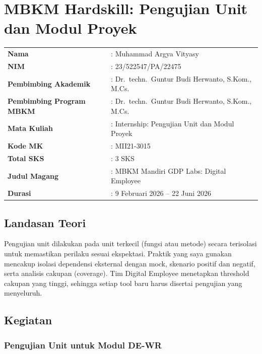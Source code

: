 \section{MBKM Hardskill: Pengujian Unit dan Modul Proyek}

\begin{table}[H]
    \centering
    \begin{tabular}{ll}
        \textbf{Nama} & : Muhammad Argya Vityasy \\
        \textbf{NIM} & : 23/522547/PA/22475 \\
        \textbf{Pembimbing Akademik} & : Dr.\ techn.\ Guntur Budi Herwanto, S.Kom., M.Cs. \\
        \textbf{Pembimbing Program MBKM} & : Dr.\ techn.\ Guntur Budi Herwanto, S.Kom., M.Cs. \\
        \textbf{Mata Kuliah} & : Internship: Pengujian Unit dan Modul Proyek \\
        \textbf{Kode MK} & : MII21-3015 \\
        \textbf{Total SKS} & : 3 SKS \\
        \textbf{Judul Magang} & : MBKM Mandiri GDP Labs: Digital Employee \\
        \textbf{Durasi} & : 9 Februari 2026 -- 22 Juni 2026 \\
    \end{tabular}
\end{table}

\subsection{Landasan Teori}

Pengujian unit dilakukan pada unit terkecil (fungsi atau metode) secara terisolasi untuk memastikan perilaku sesuai ekspektasi. Praktik yang saya gunakan mencakup isolasi dependensi eksternal dengan mock, skenario positif dan negatif, serta analisis cakupan (coverage). Tim Digital Employee menetapkan threshold cakupan yang tinggi, sehingga setiap tool baru harus disertai pengujian yang menyeluruh.

\subsection{Kegiatan}

\subsubsection{Pengujian Unit untuk Modul DE-WR}

